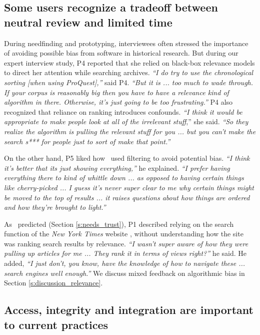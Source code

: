 \subsection[Tradeoffs between neutral review and limited time]{Some users recognize a tradeoff between neutral review and limited time}\label{s:relevance_model_feedback}

During needfinding and prototyping, interviewees often stressed the importance of avoiding possible bias from software in historical research.
But during our expert interview study, P4 reported that she relied on black-box relevance models to direct her attention while searching archives.
\textit{``I do try to use the chronological sorting [when using ProQuest],''} said P4. \textit{``But it is ... too much to wade through. If your corpus is reasonably big then you have to have a relevance kind of algorithm in there.
Otherwise, it's just going to be too frustrating.''} 
P4 also recognized that reliance on ranking introduces confounds. 
\textit{``I think it would be appropriate to make people look at all of the irrelevant stuff},'' she said. 
\textit{``So they realize the algorithm is pulling the relevant stuff for you ...
but you can’t make the search s*** for people just to sort of make that point.''} 

On the other hand, P5 liked how \ours~used filtering to avoid potential bias. \textit{``I think it's better that its just showing everything,''} he explained. \textit{``I prefer having everything there to kind of whittle down ... as opposed to having certain things like cherry-picked ... I guess it's never super clear to me why certain things might be moved to the top of results ... it raises questions about how things are ordered and how they're brought to light.''}

As \ithree~predicted (Section \ref{s:needs_trust}), P1 described relying on the search function of the \textit{New York Times} website \cite{nytwebsite}, without understanding how the site was ranking search results by relevance. 
\textit{``I wasn't super aware of how they were pulling up articles for me ... They rank it in terms of views right?''} he said. 
He added, \textit{``I just don't, you know, have the knowledge of how to navigate these ... search engines well enough.''}
We discuss mixed feedback on algorithmic bias in Section \ref{s:discussion_relevance}.

\subsection{Access, integrity and integration are important to current practices}\label{s:current_practices}

